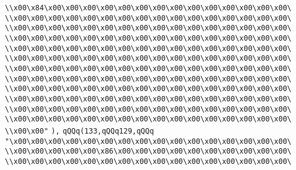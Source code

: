 \verb|\\x00\x84\x00\x00\x00\x00\x00\x00\x00\x00\x00\x00\x00\x00\x00\x00\|\newline
\verb|\\x00\x00\x00\x00\x00\x00\x00\x00\x00\x00\x00\x00\x00\x00\x00\x00\|\newline
\verb|\\x00\x00\x00\x00\x00\x00\x00\x00\x00\x00\x00\x00\x00\x00\x00\x00\|\newline
\verb|\\x00\x00\x00\x00\x00\x00\x00\x00\x00\x00\x00\x00\x00\x00\x00\x00\|\newline
\verb|\\x00\x00\x00\x00\x00\x00\x00\x00\x00\x00\x00\x00\x00\x00\x00\x00\|\newline
\verb|\\x00\x00\x00\x00\x00\x00\x00\x00\x00\x00\x00\x00\x00\x00\x00\x00\|\newline
\verb|\\x00\x00\x00\x00\x00\x00\x00\x00\x00\x00\x00\x00\x00\x00\x00\x00\|\newline
\verb|\\x00\x00\x00\x00\x00\x00\x00\x00\x00\x00\x00\x00\x00\x00\x00\x00\|\newline
\verb|\\x00\x00\x00\x00\x00\x00\x00\x00\x00\x00\x00\x00\x00\x00\x00\x00\|\newline
\verb|\\x00\x00\x00\x00\x00\x00\x00\x00\x00\x00\x00\x00\x00\x00\x00\x00\|\newline
\verb|\\x00\x00\x00\x00\x00\x00\x00\x00\x00\x00\x00\x00\x00\x00\x00\x00\|\newline
\verb|\\x00\x00\x00\x00\x00\x00\x00\x00\x00\x00\x00\x00\x00\x00\x00\x00\|\newline
\verb|\\x00\x00"|\newline
\verb|),|\newline
\verb|qQQq(133,qQQq129,qQQq|\newline
\verb|"\x00\x00\x00\x00\x00\x00\x00\x00\x00\x00\x00\x00\x00\x00\x00\x00\|\newline
\verb|\\x00\x00\x00\x00\x00\x86\x00\x00\x00\x00\x00\x00\x00\x00\x00\x00\|\newline
\verb|\\x00\x00\x00\x00\x00\x00\x00\x00\x00\x00\x00\x00\x00\x00\x00\x00\|\newline
